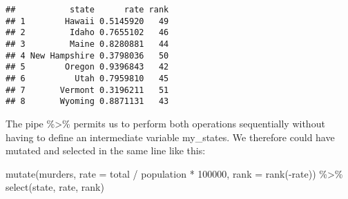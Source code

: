 \documentclass[
]{article}
\newenvironment{Shaded}{\begin{snugshade}}{\end{snugshade}}
\newcommand{\AttributeTok}[1]{\textcolor[rgb]{0.77,0.63,0.00}{#1}}
\newcommand{\DecValTok}[1]{\textcolor[rgb]{0.00,0.00,0.81}{#1}}
\newcommand{\FunctionTok}[1]{\textcolor[rgb]{0.00,0.00,0.00}{#1}}
\newcommand{\NormalTok}[1]{#1}
\newcommand{\SpecialCharTok}[1]{\textcolor[rgb]{0.00,0.00,0.00}{#1}}
\begin{document}
\begin{verbatim}
##           state      rate rank
## 1        Hawaii 0.5145920   49
## 2         Idaho 0.7655102   46
## 3         Maine 0.8280881   44
## 4 New Hampshire 0.3798036   50
## 5        Oregon 0.9396843   42
## 6          Utah 0.7959810   45
## 7       Vermont 0.3196211   51
## 8       Wyoming 0.8871131   43
\end{verbatim}

The pipe \%\textgreater\% permits us to perform both operations
sequentially without having to define an intermediate variable
my\_states. We therefore could have mutated and selected in the same
line like this:

\begin{Shaded}
\begin{Highlighting}[]
\FunctionTok{mutate}\NormalTok{(murders, }\AttributeTok{rate =}\NormalTok{  total }\SpecialCharTok{/}\NormalTok{ population }\SpecialCharTok{*} \DecValTok{100000}\NormalTok{, }
       \AttributeTok{rank =} \FunctionTok{rank}\NormalTok{(}\SpecialCharTok{{-}}\NormalTok{rate)) }\SpecialCharTok{\%\textgreater{}\%}
  \FunctionTok{select}\NormalTok{(state, rate, rank)}
\end{Highlighting}
\end{Shaded}
\end{document}
